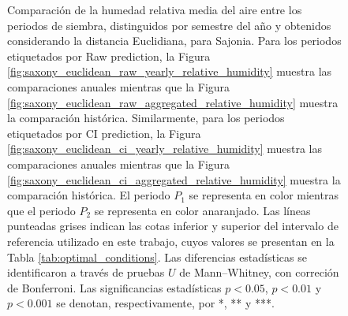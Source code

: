 \begin{figure}[htbp]
	\caption{
		Comparación de la humedad relativa media del aire entre los periodos de siembra, distinguidos por semestre del año y obtenidos considerando la distancia Euclidiana, para Sajonia. Para los periodos etiquetados por Raw prediction, la Figura \ref{fig:saxony_euclidean_raw_yearly_relative_humidity} muestra las comparaciones anuales mientras que la Figura \ref{fig:saxony_euclidean_raw_aggregated_relative_humidity} muestra la comparación histórica. Similarmente, para los periodos etiquetados por CI prediction, la Figura \ref{fig:saxony_euclidean_ci_yearly_relative_humidity} muestra las comparaciones anuales mientras que la Figura \ref{fig:saxony_euclidean_ci_aggregated_relative_humidity} muestra la comparación histórica. El periodo $P_1$ se representa en color mientras que el periodo $P_2$ se representa en color anaranjado. Las líneas punteadas grises indican las cotas inferior y superior del intervalo de referencia utilizado en este trabajo, cuyos valores se presentan en la Tabla \ref{tab:optimal_conditions}. Las diferencias estadísticas se identificaron a través de pruebas $U$ de Mann--Whitney, con correción de Bonferroni. Las significancias estadísticas $p<0.05$, $p<0.01$ y $p<0.001$ se denotan, respectivamente, por *, ** y ***.
	}
	\label{fig:saxony_euclidean_relative_humidity}
	
	
\end{figure}



